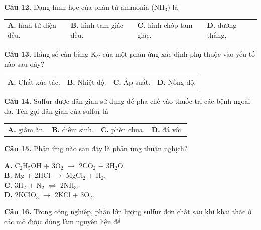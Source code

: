 \documentclass[13pt,a4paper]{article}
\begin{document}
\vspace{1.6cm}

\textbf{Câu 12.} Dạng hình học của phân tử ammonia (NH$_{3}$) là

\begin{tabularx}{\textwidth}{@{}XXXX@{}}
\textbf{A.} hình tứ diện đều. & \textbf{B.} hình tam giác đều. & \textbf{C.} hình chóp tam giác. & \textbf{D.} đường thẳng. \\
\end{tabularx}

\vspace{1.6cm}

\textbf{Câu 13.} Hằng số cân bằng K$_{C}$ của một phản ứng xác định phụ thuộc vào yếu tố nào sau đây?

\begin{tabularx}{\textwidth}{@{}XXXX@{}}
\textbf{A.} Chất xúc tác. & \textbf{B.} Nhiệt độ. & \textbf{C.} Áp suất. & \textbf{D.} Nồng độ. \\
\end{tabularx}

\vspace{1.6cm}

\textbf{Câu 14.} Sulfur được dân gian sử dụng để pha chế vào thuốc trị các bệnh ngoài da. Tên gọi dân gian của sulfur là

\begin{tabularx}{\textwidth}{@{}XXXX@{}}
\textbf{A.} giấm ăn. & \textbf{B.} diêm sinh. & \textbf{C.} phèn chua. & \textbf{D.} đá vôi. \\
\end{tabularx}

\vspace{1.6cm}

\textbf{Câu 15.} Phản ứng nào sau đây là phản ứng thuận nghịch?

\quad \textbf{A.} C$_{2}$H$_{5}$OH + 3O$_{2}$ $\longrightarrow$ 2CO$_{2}$ + 3H$_{2}$O.\\
\quad \textbf{B.} Mg + 2HCl $\longrightarrow$ MgCl$_{2}$ + H$_{2}$.\\
\quad \textbf{C.} 3H$_{2}$ + N$_{2}$ $\rightleftharpoons$ 2NH$_{3}$.\\
\quad \textbf{D.} 2KClO$_{3}$ $\longrightarrow$ 2KCl + 3O$_{2}$.\\

\vspace{1.6cm}

\textbf{Câu 16.} Trong công nghiệp, phần lớn lượng sulfur đơn chất sau khi khai thác ở các mỏ được dùng làm nguyên liệu để
\end{document}
